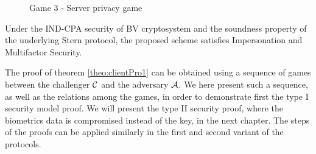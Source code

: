 \begin{figure}[htbp!] 
  \centering
  \caption{Game 3 - Server privacy game}
  \label{fig:game3protocol1server}
\end{figure}

\begin{theorem}
  \label{theo:clientPro1}
  Under the IND-CPA security of BV cryptosystem and the soundness property of
  the underlying Stern protocol, the proposed scheme satisfies Impersonation and
  Multifactor Security.
\end{theorem}

The proof of theorem \ref{theo:clientPro1} can be obtained using a sequence of games
between the challenger $\mathcal{C}$ and the adversary $\mathcal{A}$. We here
present such a sequence, as well as the relations among the games, in order to
demonstrate first the type I security model proof. We will present the type II
security proof, where the biometrics data is compromised instead of the key, in
the next chapter. The steps of the proofs can be applied similarly in the first
and second variant of the protocols.

